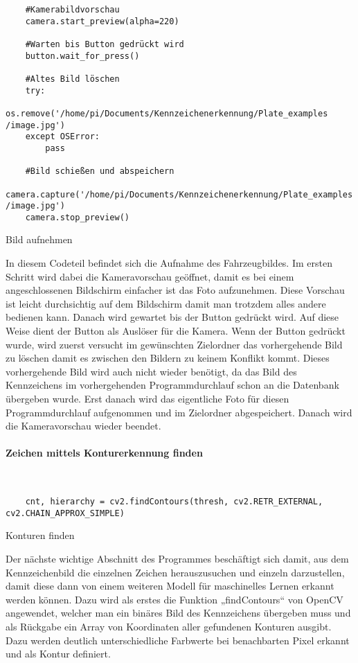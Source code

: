 \begin{longlisting}
    \begin{verbatim}
    #Kamerabildvorschau
    camera.start_preview(alpha=220)

    #Warten bis Button gedrückt wird
    button.wait_for_press()

    #Altes Bild löschen
    try:
        os.remove('/home/pi/Documents/Kennzeichenerkennung/Plate_examples /image.jpg')
    except OSError:
        pass

    #Bild schießen und abspeichern 
    camera.capture('/home/pi/Documents/Kennzeichenerkennung/Plate_examples /image.jpg')
    camera.stop_preview()
    \end{verbatim}
    \caption{Bild aufnehmen}
\end{longlisting}

In diesem Codeteil befindet sich die Aufnahme des Fahrzeugbildes. Im ersten Schritt wird dabei die Kameravorschau geöffnet, damit es 
bei einem angeschlossenen Bildschirm einfacher ist das Foto aufzunehmen. Diese Vorschau ist leicht durchsichtig auf dem Bildschirm 
damit man trotzdem alles andere bedienen kann. Danach wird gewartet bis der Button gedrückt wird. Auf diese Weise dient der Button als 
Auslöser für die Kamera. Wenn der Button gedrückt wurde, wird zuerst versucht im gewünschten Zielordner das vorhergehende Bild zu löschen 
damit es zwischen den Bildern zu keinem Konflikt kommt. Dieses vorhergehende Bild wird auch nicht wieder benötigt, da das Bild des 
Kennzeichens im vorhergehenden Programmdurchlauf schon an die Datenbank übergeben wurde. Erst danach wird das eigentliche Foto für 
diesen Programmdurchlauf aufgenommen und im Zielordner abgespeichert. Danach wird die Kameravorschau wieder beendet.

\paragraph{Zeichen mittels Konturerkennung finden}\mbox{}\\

\begin{listing}[H]
    \begin{verbatim}
    cnt, hierarchy = cv2.findContours(thresh, cv2.RETR_EXTERNAL, cv2.CHAIN_APPROX_SIMPLE)
    \end{verbatim}
    \caption{Konturen finden}
\end{listing}

Der nächste wichtige Abschnitt des Programmes beschäftigt sich damit, aus dem Kennzeichenbild die einzelnen Zeichen herauszusuchen und einzeln 
darzustellen, damit diese dann von einem weiteren Modell für maschinelles Lernen erkannt werden können. Dazu wird als erstes die Funktion „findContours“ 
von OpenCV angewendet, welcher man ein binäres Bild des Kennzeichens übergeben muss und als Rückgabe ein Array von Koordinaten aller gefundenen Konturen ausgibt.
Dazu werden deutlich unterschiedliche Farbwerte bei benachbarten Pixel erkannt und als Kontur definiert.

